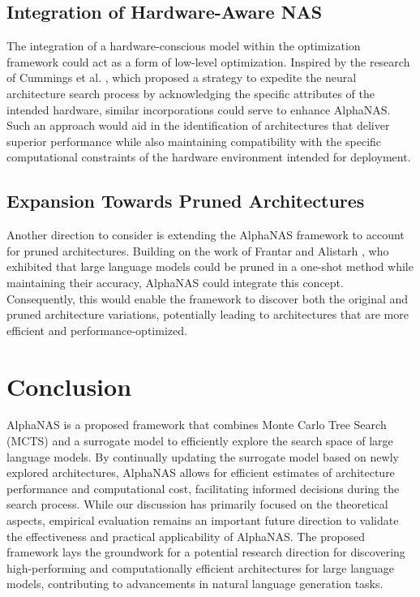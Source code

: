 \documentclass{article}
\begin{document}
\subsection{Integration of Hardware-Aware NAS}

The integration of a hardware-conscious model within the optimization framework could act as a form of low-level optimization. Inspired by the research of Cummings et al. \cite{cummings2022hardwareaware}, which proposed a strategy to expedite the neural architecture search process by acknowledging the specific attributes of the intended hardware, similar incorporations could serve to enhance AlphaNAS. Such an approach would aid in the identification of architectures that deliver superior performance while also maintaining compatibility with the specific computational constraints of the hardware environment intended for deployment.

\subsection{Expansion Towards Pruned Architectures}

Another direction to consider is extending the AlphaNAS framework to account for pruned architectures. Building on the work of Frantar and Alistarh \cite{frantar2023sparsegpt}, who exhibited that large language models could be pruned in a one-shot method while maintaining their accuracy, AlphaNAS could integrate this concept. Consequently, this would enable the framework to discover both the original and pruned architecture variations, potentially leading to architectures that are more efficient and performance-optimized.

\section{Conclusion}

AlphaNAS is a proposed framework that combines Monte Carlo Tree Search (MCTS) and a surrogate model to efficiently explore the search space of large language models. By continually updating the surrogate model based on newly explored architectures, AlphaNAS allows for efficient estimates of architecture performance and computational cost, facilitating informed decisions during the search process. While our discussion has primarily focused on the theoretical aspects, empirical evaluation remains an important future direction to validate the effectiveness and practical applicability of AlphaNAS. The proposed framework lays the groundwork for a potential research direction for discovering high-performing and computationally efficient architectures for large language models, contributing to advancements in natural language generation tasks.


  
  
\end{document}

